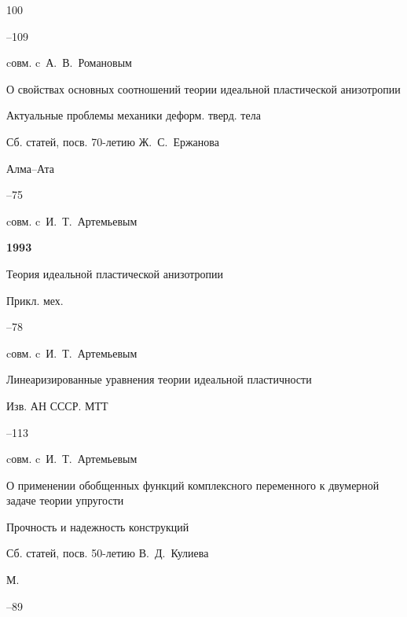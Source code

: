 \begin{thebibliography}{100}


–109

\miscnote cовм. c~А.~В.~Романовым




\paper О свойствах основных соотношений теории идеальной пластической анизотропии 

\inbook Актуальные проблемы механики деформ. тверд. тела

\bookinfo Сб. статей, посв. 70-летию Ж.~С.~Ержанова

\publaddr Алма--Ата


–75 

\miscnote cовм. c~И.~Т.~Артемьевым



\item[] \centerline{\bf 1993}




\paper Теория идеальной пластической анизотропии 

\jour Прикл. мех.




–78 

\miscnote cовм. c~И.~Т.~Артемьевым




\paper Линеаризированные уравнения теории идеальной пластичности 

\jour Изв. АН СССР. МТТ



–113 

\miscnote cовм. c~И.~Т.~Артемьевым




\paper О применении обобщенных функций комплексного переменного к двумерной задаче теории упругости 

\inbook Прочность и надежность конструкций

\bookinfo Сб. статей, посв. 50-летию В.~Д.~Кулиева

\publaddr М.


–89 


\end{thebibliography}
